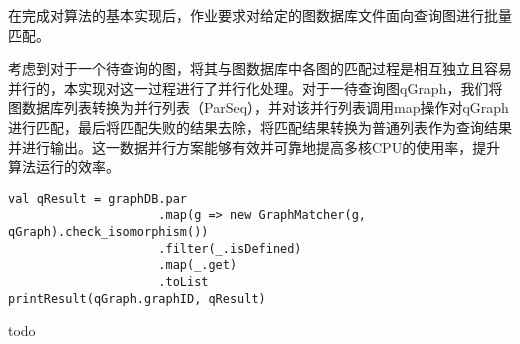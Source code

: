\documentclass{article}
\begin{document}

在完成对算法的基本实现后，作业要求对给定的图数据库文件面向查询图进行批量匹配。

考虑到对于一个待查询的图，将其与图数据库中各图的匹配过程是相互独立且容易并行的，本实现对这一过程进行了并行化处理。对于一待查询图qGraph，我们将图数据库列表转换为并行列表（ParSeq），并对该并行列表调用map操作对qGraph进行匹配，最后将匹配失败的结果去除，将匹配结果转换为普通列表作为查询结果并进行输出。这一数据并行方案能够有效并可靠地提高多核CPU的使用率，提升算法运行的效率。

\begin{lstlisting}[style=mStyle]
val qResult = graphDB.par
                     .map(g => new GraphMatcher(g, qGraph).check_isomorphism())
                     .filter(_.isDefined)
                     .map(_.get)
                     .toList
printResult(qGraph.graphID, qResult)
\end{lstlisting}

\begin{thebibliography}{9}

  todo

\end{thebibliography}
\end{document}
